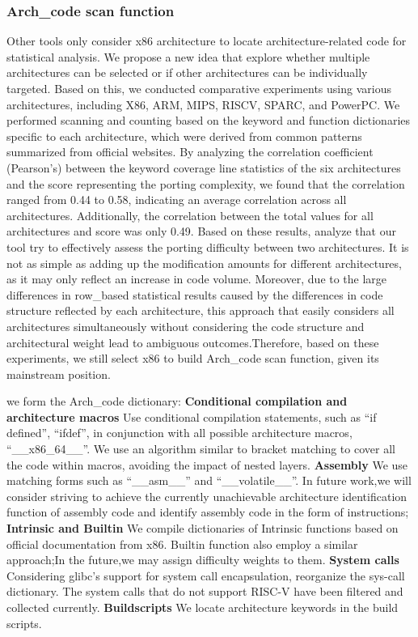 \documentclass[sigconf,screen,review,anonymous]{acmart}
\begin{document}
\subsubsection{Arch\_code scan function}
Other tools only consider x86 architecture to locate architecture-related code for statistical analysis. We propose a new idea that explore whether multiple architectures can be selected or if other architectures can be individually targeted. Based on this, we conducted comparative experiments using various architectures, including X86, ARM, MIPS, RISCV, SPARC, and PowerPC. We performed scanning and counting based on the keyword and function dictionaries specific to each architecture, which were derived from common patterns summarized from official websites.
By analyzing the correlation coefficient (Pearson's) between the keyword coverage line statistics of the six architectures and the score representing the porting complexity, we found that the correlation ranged from 0.44 to 0.58, indicating an average correlation across all architectures. Additionally, the correlation between the total values for all architectures and score was only 0.49.
Based on these results, analyze that our tool try to effectively assess the porting difficulty between two architectures. It is not as simple as adding up the modification amounts for different architectures, as it may only reflect an increase in code volume. Moreover, due to the large differences in row\_based statistical results caused by the differences in code structure reflected by each architecture, this approach that easily considers all architectures simultaneously without considering the code structure and architectural weight lead to ambiguous outcomes.Therefore, based on these experiments, we still select x86 to build Arch\_code scan function, given its mainstream position.

we form the Arch\_code dictionary:
\textbf{Conditional compilation and architecture macros} Use conditional compilation statements, such as ``if defined'', ``ifdef'', in conjunction with all possible architecture macros,
  ``\_\_x86\_64\_\_''.
  We use an algorithm similar to bracket matching to cover all the code within macros, avoiding the impact of nested layers.
  \textbf{Assembly} We use matching forms such as ``\_\_asm\_\_'' and ``\_\_volatile\_\_''.
  In future work,we will consider striving to achieve the currently unachievable architecture identification function of assembly code and identify assembly code in the form of instructions;
  \textbf{Intrinsic and Builtin} 
  We compile dictionaries of Intrinsic functions based on official documentation from x86\cite{x86intrin}.
  Builtin function also employ a similar approach;In the future,we may assign difficulty weights to them.
  \textbf{System calls} Considering glibc's support for system call encapsulation, reorganize the sys-call dictionary.
  The system calls that do not support RISC-V have been filtered and collected currently.
  \textbf{Buildscripts} We locate architecture keywords in the build scripts.
 
\end{document}
